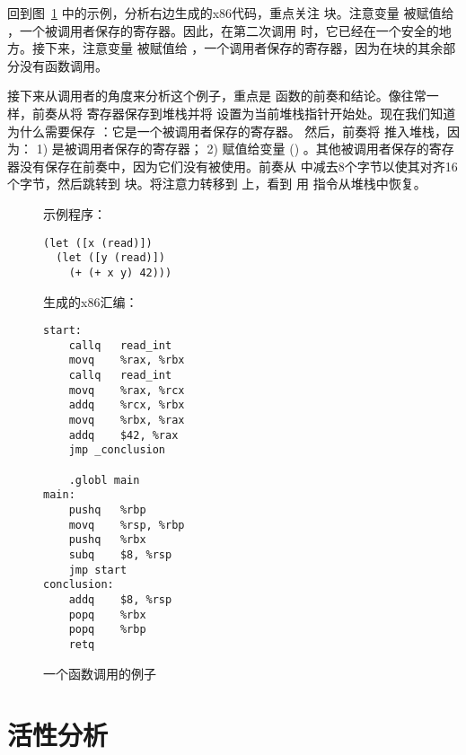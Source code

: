 \documentclass[11pt]{book}
\begin{document}
回到图~\ref{fig:example-calling-conventions} 中的示例，分析右边生成的x86代码，重点关注
 块。注意变量  被赋值给
 ，一个被调用者保存的寄存器。因此，在第二次调用  时，它已经在一个安全的地方。接下来，注意变量  被赋值给  ，一个调用者保存的寄存器，因为在块的其余部分没有函数调用。

接下来从调用者的角度来分析这个例子，重点是  函数的前奏和结论。像往常一样，前奏从将  寄存器保存到堆栈并将  设置为当前堆栈指针开始处。现在我们知道为什么需要保存  ：它是一个被调用者保存的寄存器。
然后，前奏将  推入堆栈，因为： 1) 
是被调用者保存的寄存器； 2)  赋值给变量
() 。其他被调用者保存的寄存器没有保存在前奏中，因为它们没有被使用。前奏从  中减去8个字节以使其对齐16个字节，然后跳转到
 块。将注意力转移到  上，看到  用 
指令从堆栈中恢复。  

\begin{figure}[tp]
\begin{minipage}{0.45\textwidth}
 \LangVar{} 示例程序：
\begin{lstlisting}
(let ([x (read)])
  (let ([y (read)])
    (+ (+ x y) 42)))
\end{lstlisting}
\end{minipage}
\begin{minipage}{0.45\textwidth}
生成的x86汇编：
\begin{lstlisting}
start:
	callq	read_int
	movq	%rax, %rbx
	callq	read_int
	movq	%rax, %rcx
	addq	%rcx, %rbx
	movq	%rbx, %rax
	addq	$42, %rax
	jmp _conclusion

	.globl main
main:
	pushq	%rbp
	movq	%rsp, %rbp
	pushq	%rbx
	subq	$8, %rsp
	jmp start
conclusion:
	addq	$8, %rsp
	popq	%rbx
	popq	%rbp
	retq
\end{lstlisting}
\end{minipage}
\caption{一个函数调用的例子}
  \label{fig:example-calling-conventions}
\end{figure}

\clearpage

\section{活性分析}
\label{sec:liveness-analysis-Rvar}
\end{document}
